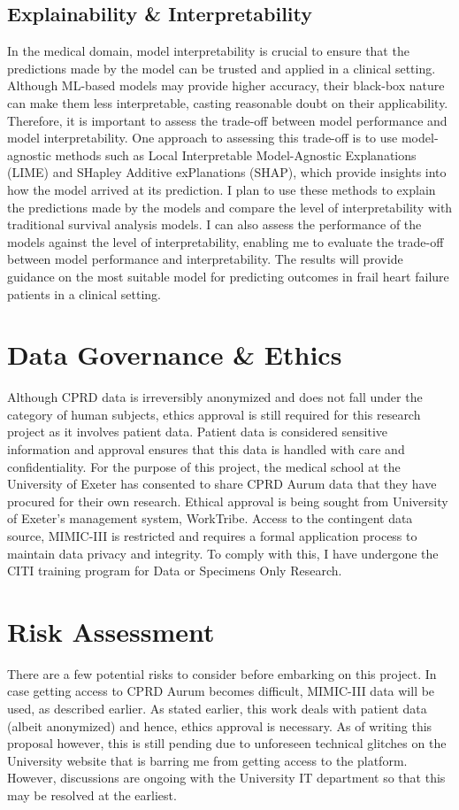 \documentclass[%
 reprint,
 amsmath,amssymb,
 aps,
 nofootinbib,
]{revtex4-2}
\theoremstyle{definition}
\begin{document}
\subsection{\label{expla}Explainability \& Interpretability}
In the medical domain, model interpretability is crucial to ensure that the predictions made by the model can be trusted and applied in a clinical setting. Although ML-based models may provide higher accuracy, their black-box nature can make them less interpretable, casting reasonable doubt on their applicability. Therefore, it is important to assess the trade-off between model performance and model interpretability. One approach to assessing this trade-off is to use model-agnostic methods such as Local Interpretable Model-Agnostic Explanations (LIME) and SHapley Additive exPlanations (SHAP), which provide insights into how the model arrived at its prediction. I plan to use these methods to explain the predictions made by the models and compare the level of interpretability with traditional survival analysis models. I can also assess the performance of the models against the level of interpretability, enabling me to evaluate the trade-off between model performance and interpretability. The results will provide guidance on the most suitable model for predicting outcomes in frail heart failure patients in a clinical setting.

\section{\label{gov}Data Governance \& Ethics}
Although CPRD data is irreversibly anonymized and does not fall under the category of human subjects, ethics approval is still required for this research project as it involves patient data. Patient data is considered sensitive information and approval ensures that this data is handled with care and confidentiality. For the purpose of this project, the medical school at the University of Exeter has consented to share CPRD Aurum data that they have procured for their own research. Ethical approval is being sought from University of Exeter's management system, WorkTribe. Access to the contingent data source, MIMIC-III is restricted and requires a formal application process to maintain data privacy and integrity. To comply with this, I have undergone the CITI training program for Data or Specimens Only Research.

\section{\label{risk}Risk Assessment}
There are a few potential risks to consider before embarking on this project. In case getting access to CPRD Aurum becomes difficult, MIMIC-III data will be used, as described earlier. As stated earlier, this work deals with patient data (albeit anonymized) and hence, ethics approval is necessary. As of writing this proposal however, this is still pending due to unforeseen technical glitches on the University website that is barring me from getting access to the platform. However, discussions are ongoing with the University IT department so that this may be resolved at the earliest.
\end{document}

